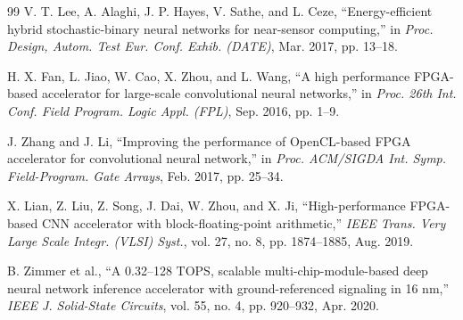 \documentclass{solitairemiya-art}
\begin{document}
\begin{thebibliography}{99}
 V. T. Lee, A. Alaghi, J. P. Hayes, V. Sathe, and L. Ceze, ``Energy-efficient hybrid stochastic-binary neural networks for near-sensor computing,'' in \textit{Proc. Design, Autom. Test Eur. Conf. Exhib. (DATE)}, Mar. 2017, pp. 13--18.

 H. X. Fan, L. Jiao, W. Cao, X. Zhou, and L. Wang, ``A high performance FPGA-based accelerator for large-scale convolutional neural networks,'' in \textit{Proc. 26th Int. Conf. Field Program. Logic Appl. (FPL)}, Sep. 2016, pp. 1--9.

 J. Zhang and J. Li, ``Improving the performance of OpenCL-based FPGA accelerator for convolutional neural network,'' in \textit{Proc. ACM/SIGDA Int. Symp. Field-Program. Gate Arrays}, Feb. 2017, pp. 25--34.

 X. Lian, Z. Liu, Z. Song, J. Dai, W. Zhou, and X. Ji, ``High-performance FPGA-based CNN accelerator with block-floating-point arithmetic,'' \textit{IEEE Trans. Very Large Scale Integr. (VLSI) Syst.}, vol. 27, no. 8, pp. 1874--1885, Aug. 2019.

 B. Zimmer et al., ``A 0.32--128 TOPS, scalable multi-chip-module-based deep neural network inference accelerator with ground-referenced signaling in 16 nm,'' \textit{IEEE J. Solid-State Circuits}, vol. 55, no. 4, pp. 920--932, Apr. 2020.
\end{thebibliography}
\end{document}
